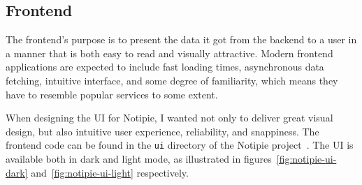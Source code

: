\subsection{Frontend}\label{sec:frontend}

The frontend's purpose is to present the data
it got from the backend to a user
in a manner that is both easy to read
and visually attractive.
Modern frontend applications
are expected to include
fast loading times,
asynchronous data fetching,
intuitive interface,
and some degree of familiarity,
which means they have to resemble
popular services to some extent.

When designing the \ac{UI} for Notipie,
I wanted not only to deliver great visual design,
but also intuitive user experience,
reliability,
and snappiness.
The frontend code
can be found in the
\texttt{ui} directory of the Notipie project~\cite{sewera_notipie_2022-5}.
The \ac{UI} is available both in dark and light mode,
as illustrated in figures~\ref{fig:notipie-ui-dark}
and~\ref{fig:notipie-ui-light} respectively.

